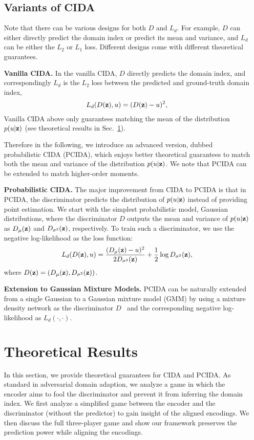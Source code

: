 \documentclass{article}
\newcommand{\secref}[1]{Sec.~\ref{#1}}
\begin{document}
\subsection{Variants of CIDA}\label{sec:pcida}
Note that there can be various designs for both $D$ and $L_d$. For example, $D$ can either directly predict the domain index or predict its mean and variance, and $L_d$ can be either the $L_2$ or $L_1$ loss. Different designs come with different theoretical guarantees. 

\textbf{Vanilla CIDA.} In the vanilla CIDA, $D$ directly predicts the domain index, and correspondingly $L_d$ is the $L_2$ loss between the predicted and ground-truth domain index,
\begin{align}
\label{eq:l2_loss}
L_d(D({\bf z}),u) = (D({\bf z}) - u)^2,
\end{align}
Vanilla CIDA above only guarantees matching the mean of the distribution $p(u|{\bf z})$ (see theoretical results in \secref{sec:theory}). 

Therefore in the following, we introduce an advanced version, dubbed probabilistic CIDA (PCIDA), which enjoys better theoretical guarantees to match both the mean and variance of the distribution $p(u|{\bf z})$. We note that PCIDA can be extended to match higher-order moments.

\textbf{Probabilistic CIDA.} The major improvement from CIDA to PCIDA is that in PCIDA, the discriminator predicts the distribution of $p(u|{\bf z})$ instead of providing point estimation. We start with the simplest probabilistic model, Gaussian distributions, where the discriminator $D$ outputs the mean and variance of $p(u|{\bf z})$ as $D_{\mu}({\bf z})$ and $D_{\sigma^2}({\bf z})$, respectively. To train such a discriminator, we use the negative log-likelihood as the loss function:
\begin{align}
\label{eq:guass_loss}
L_d(D({\bf z}),u) = \frac{(D_{\mu}({\bf z}) - u)^2}{2 D_{\sigma^2}({\bf z})} + \frac{1}{2}\log D_{\sigma^2}({\bf z}),
\end{align}
where $D({\bf z})=(D_{\mu}({\bf z}), D_{\sigma^2}({\bf z}))$. 

\textbf{Extension to Gaussian Mixture Models.} PCIDA can be naturally extended from a single Gaussian to a Gaussian mixture model (GMM) by using a mixture density network as the discriminator $D$~\cite{MDN} and the corresponding negative log-likelihood as $L_d(\cdot,\cdot)$.  \section{Theoretical Results}\label{sec:theory}
In this section, we provide theoretical guarantees for CIDA and PCIDA. As standard in adversarial domain adaption, we analyze a game in which the encoder aims to fool the discriminator and prevent it from inferring the domain index.  We first analyze a simplified game between the encoder and the discriminator (without the predictor) to gain insight of the aligned encodings. We then discuss the full three-player game and show our framework preserves the prediction power while aligning the encodings.
\end{document}
